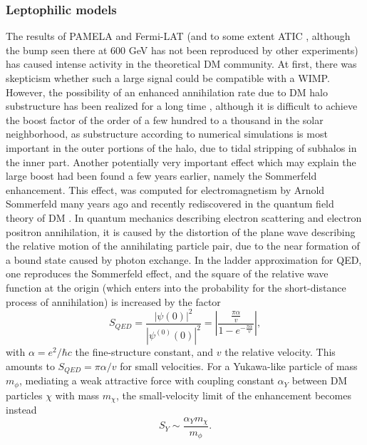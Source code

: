 \documentclass[10pt,aps,pra,reprint,amsmath,amsfonts,amssymb,showpacs,nofootinbib,floatfix]{revtex4-1}
\begin{document}
\subsubsection{Leptophilic models}
\label{sect:LP}
The results of PAMELA \cite{Adriani:2008zr} and Fermi-LAT
\cite{Abdo:2009zk} (and to some extent ATIC
\cite{2008Natur.456..362C}, although the bump seen there at 600 GeV
has not been reproduced by other experiments) has caused intense
activity in the theoretical DM community. At first, there was
skepticism whether such a large signal could be compatible with a
WIMP. However, the possibility of an enhanced annihilation rate due to
DM halo substructure has been realized for a long time
\cite{1993ApJ...411..439S,Bergstrom:1998zs,Moore:1999nt}, although it
is difficult to achieve the boost factor of the order of a few hundred
to a thousand in the solar neighborhood, as substructure according to
numerical simulations is most important in the outer portions of the
halo, due to tidal stripping of subhalos in the inner part. Another
potentially very important effect which may explain the large boost
had been found a few years earlier, namely the Sommerfeld
enhancement. This effect, was computed for electromagnetism by Arnold
Sommerfeld many years ago \cite{sommerfeld} and recently rediscovered
in the quantum field theory of DM
\cite{2005PhRvD..71f3528H,2007NuPhB.787..152C,2009PhRvD..79a5014A}.
In quantum mechanics describing electron scattering and electron
positron annihilation, it is caused by the distortion of the plane
wave describing the relative motion of the annihilating particle pair,
due to the near formation of a bound state caused by photon
exchange. In the ladder approximation for QED, one reproduces the
Sommerfeld effect, and the square of the relative wave function at the
origin (which enters into the probability for the short-distance
process of annihilation) is increased by the factor
\cite{2009PhRvD..79a5014A}
\begin{equation}
S_{QED}=\frac{|\psi(0)|^2}{|\psi^{(0)}(0)|^2}=
\left|\frac{\frac{\pi\alpha}{v}}{1-e^{-\frac{\pi\alpha}{v}}}\right|,
\end{equation}
with $\alpha =e^2/\hbar c$ the fine-structure constant, and $v$ the relative
velocity. This amounts to $S_{QED}=\pi\alpha/v$ for small velocities. For a
Yukawa-like particle of mass $m_\phi$, mediating a weak attractive force with
coupling constant $\alpha_Y$ between DM particles $\chi$ with mass
$m_\chi$, the small-velocity limit of the enhancement becomes instead
\begin{equation}
S_Y\sim\frac{\alpha_Y m_\chi}{m_\phi}.
\label{eq:saturation}
\end{equation}
\end{document}
